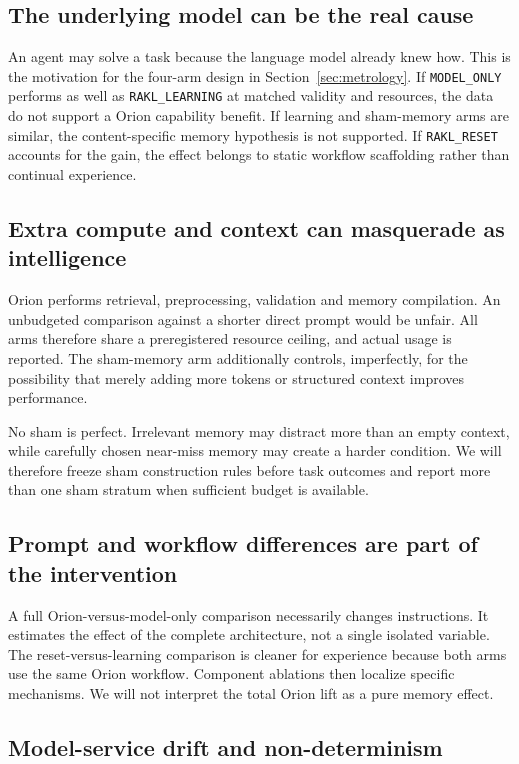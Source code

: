 \subsection{The underlying model can be the real cause}

An agent may solve a task because the language model already knew how. This is the motivation for the four-arm design in Section~\ref{sec:metrology}. If \texttt{MODEL\_ONLY} performs as well as \texttt{RAKL\_LEARNING} at matched validity and resources, the data do not support a Orion capability benefit. If learning and sham-memory arms are similar, the content-specific memory hypothesis is not supported. If \texttt{RAKL\_RESET} accounts for the gain, the effect belongs to static workflow scaffolding rather than continual experience.

\subsection{Extra compute and context can masquerade as intelligence}

Orion performs retrieval, preprocessing, validation and memory compilation. An unbudgeted comparison against a shorter direct prompt would be unfair. All arms therefore share a preregistered resource ceiling, and actual usage is reported. The sham-memory arm additionally controls, imperfectly, for the possibility that merely adding more tokens or structured context improves performance.

No sham is perfect. Irrelevant memory may distract more than an empty context, while carefully chosen near-miss memory may create a harder condition. We will therefore freeze sham construction rules before task outcomes and report more than one sham stratum when sufficient budget is available.

\subsection{Prompt and workflow differences are part of the intervention}

A full Orion-versus-model-only comparison necessarily changes instructions. It estimates the effect of the complete architecture, not a single isolated variable. The reset-versus-learning comparison is cleaner for experience because both arms use the same Orion workflow. Component ablations then localize specific mechanisms. We will not interpret the total Orion lift as a pure memory effect.

\subsection{Model-service drift and non-determinism}

